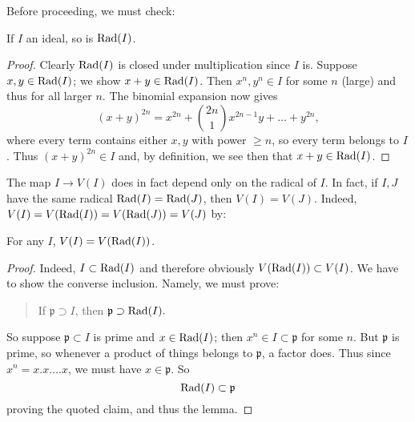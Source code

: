 Before proceeding, we must check:
\begin{lemma} 
If $I$ an ideal, so is $\mathrm{Rad}(I)$.
\end{lemma} 
\begin{proof} 
Clearly $\mathrm{Rad}(I)$ is closed under multiplication since $I$ is.  
Suppose $x,y \in \mathrm{Rad}(I)$; we show $x+y \in \mathrm{Rad}(I)$.  Then $x^n, y^n \in I$
for some $n$ (large) and thus for all larger $n$. The binomial expansion now
gives
\[ (x+y)^{2n} = x^{2n} + \binom{2n}{1} x^{2n-1}y + \dots + y^{2n},  \]
where every term contains either $x,y$ with power $ \geq n$, so every term
belongs to $I$.  Thus $(x+y)^{2n} \in I$ and, by definition, we see then that $x+y \in \mathrm{Rad}(I)$. 
\end{proof} 

The map $I \to V(I)$ does in fact depend only on the radical of $I$. In fact, if $I,J$ have the same radical $\mathrm{Rad}(I) = \mathrm{Rad}(J)$, then $V(I) = V(J)$. 
Indeed, $V(I) = V(\mathrm{Rad}(I)) = V(\mathrm{Rad}(J)) = V(J)$ by:
\begin{lemma} 
For any $I$, $V(I) = V(\mathrm{Rad}(I))$.
\end{lemma} 
\begin{proof} 
Indeed, $I \subset \mathrm{Rad}(I)$ and therefore obviously $V(\mathrm{Rad}(I)) \subset V(I)$. We have to show the
converse inclusion. Namely, we must prove:
\begin{quote}
If $\mathfrak{p} \supset I$, then $\mathfrak{p} \supset  \mathrm{Rad}(I).$
\end{quote}
So suppose $\mathfrak{p} \subset I$ is prime and $x \in \mathrm{Rad}(I)$; then $x^n \in I \subset \mathfrak{p}$ for some $n$.
But $\mathfrak{p}$ is prime, so whenever a  product of things belongs to
$\mathfrak{p}$, a factor does.  Thus since $x^n = x . x \dots . x$, we must
have $x \in \mathfrak{p}$. So
\[ \mathrm{Rad}(I) \subset \mathfrak{p}  \]
proving the quoted claim, and thus the lemma.
\end{proof} 

